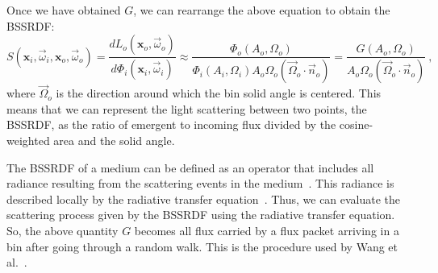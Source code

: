 \documentclass[10pt,a4paper]{article}
\newcommand{\x}{\mathbf{x}}
\newcommand{\vomega}{\vec{\omega}}
\begin{document}
Once we have obtained $G$, we can rearrange the above equation to obtain the BSSRDF:
%
\begin{equation}
S(\x_i, \vomega_i, \x_o, \vomega_o) = \frac{d L_o(\x_o, \vomega_o)}{d\Phi_i(\x_i, \vomega_i)} \approx \frac{\Phi_o(A_o, \Omega_o)}{\Phi_i(A_i, \Omega_i) A_o \Omega_o (\vec{\Omega}_o \cdot \vec{n}_o)} = \frac{G(A_o, \Omega_o)}{ A_o \Omega_o (\vec{\Omega}_o \cdot \vec{n}_o)} \ ,
\label{eq:bssrdf}
\end{equation}
%
where $\vec{\Omega}_o$ is the direction around which the bin solid angle is centered. This means that we can represent the light scattering between two points, the BSSRDF, as the ratio of emergent to incoming flux divided by the cosine-weighted area and the solid angle.



The BSSRDF of a medium can be defined as an operator that includes all radiance resulting from the scattering events in the medium~\citep{preisendorfer65}. This radiance is described locally by the radiative transfer equation~\citep{preisendorfer65}. Thus, we can evaluate the scattering process given by the BSSRDF using the radiative transfer equation. So, the above quantity $G$ becomes all flux carried by a flux packet arriving in a bin after going through a random walk. This is the procedure used by Wang et al.~\cite{wang1995}.
\end{document}

